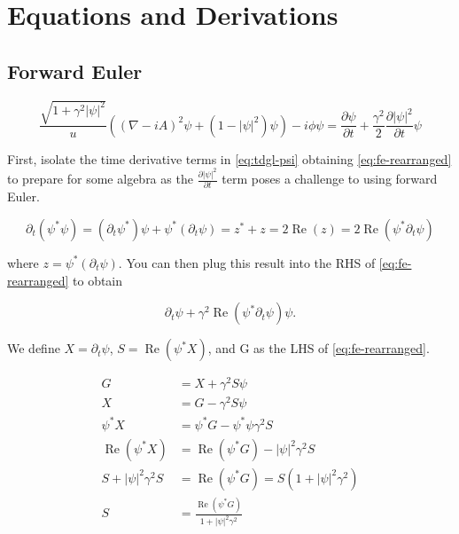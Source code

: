 \documentclass[11pt]{article}
\theoremstyle{definition}
\renewcommand{\Re}{\operatorname{Re}}
\begin{document}

\section{Equations and Derivations}
\label{sec:derivations}

\subsection{Forward Euler}
\label{sec:forward-euler}

\begin{equation}
\label{eq:fe-rearranged}
\frac{\sqrt{1 + \gamma^2 |\psi|^2}}{u} \left( (\nabla -iA)^2 \psi + (1 - |\psi|^2) \psi \right) - i \phi \psi = \frac{\partial \psi}{\partial t} + \frac{\gamma^2}{2} \frac{\partial |\psi|^2}{\partial t} \psi
\end{equation}

First, isolate the time derivative terms in \cref{eq:tdgl-psi} obtaining \cref{eq:fe-rearranged} to prepare for some algebra as the $\frac{\partial |\psi|^2}{\partial t}$ term poses a challenge to using forward Euler.

\begin{equation}
\label{eq:dt-modsq}
\partial_t (\psi^* \psi) = (\partial_t \psi^*) \psi + \psi^* (\partial_t \psi) = z^* + z = 2\Re(z) = 2\Re(\psi^* \partial_t \psi)
\end{equation}

where $z = \psi^* (\partial_t \psi)$. You can then plug this result into the RHS of \cref{eq:fe-rearranged} to obtain

\begin{equation}
\label{eq:rhs-sub}
\partial_t \psi + \gamma^2 \Re(\psi^* \partial_t \psi) \psi.
\end{equation}

We define $X = \partial_t \psi$, $S = \Re(\psi^* X)$, and G as the LHS of \cref{eq:fe-rearranged}.

\begin{align}
G &= X + \gamma^2 S \psi \label{eq:G-def}\\
X &= G - \gamma^2 S \psi \label{eq:X-def}\\
\psi^* X &= \psi^* G - \psi^* \psi \gamma^2 S \label{eq:psiX}\\
\Re(\psi^* X) &= \Re(\psi^* G) - |\psi|^2 \gamma^2 S \label{eq:RepsiX}\\
S + |\psi|^2 \gamma^2 S &= \Re(\psi^* G) = S (1 + |\psi|^2 \gamma^2) \label{eq:Ssum}\\
S &= \frac{\Re(\psi^* G)}{1 + |\psi|^2 \gamma^2} \label{eq:S-result}
\end{align}
\end{document}
